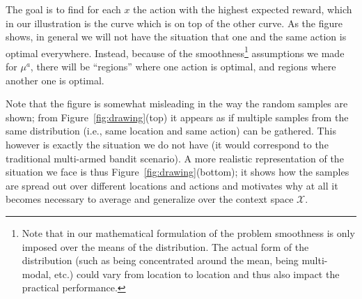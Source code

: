 \documentclass{llncs}
\begin{document}
The goal is to find for each $x$ the action with the highest expected reward, 
which in our illustration is the curve which is on top of the other curve. As
the figure shows, in general we will not have the situation that one and the
same action is optimal everywhere. Instead, because of the smoothness\footnote{Note 
that in our mathematical formulation of the problem smoothness is only imposed
over the means of the distribution. The actual form of the distribution (such as
being concentrated around the mean, being multi-modal, etc.) could vary
from location to location and thus also impact the practical performance.} 
assumptions we made for $\mu^a$, there will be ``regions'' where one action 
is optimal, and regions where another one is optimal.

Note that the figure is somewhat misleading in the way the random samples are 
shown; from Figure~\ref{fig:drawing}(top) it appears as if multiple samples from the same distribution
(i.e., same location and same action) can be gathered. This however is exactly
the situation we do not have (it would correspond to the traditional 
multi-armed bandit scenario). A more realistic representation of the situation we
face is thus Figure~\ref{fig:drawing}(bottom); it shows how the samples are spread out over 
different locations and actions and motivates why at all it becomes necessary to 
average and generalize over the context space $\mathcal X$.
\end{document}
